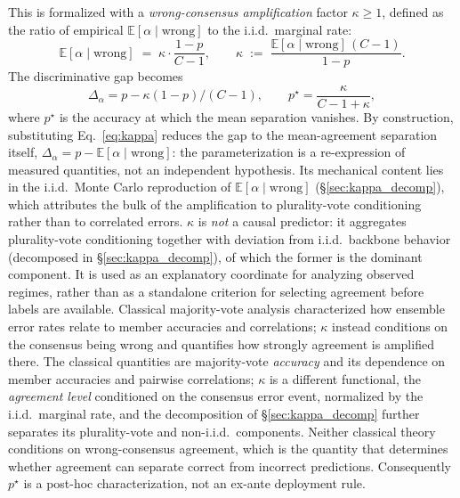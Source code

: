 \documentclass[a4paper,fleqn]{cas-sc}
\begin{document}
This is formalized with a \emph{wrong-consensus amplification} factor $\kappa \geq 1$, defined as the ratio of empirical $\mathbb{E}[\alpha \mid \text{wrong}]$ to the i.i.d.\ marginal rate:
\begin{equation}
\mathbb{E}[\alpha \mid \text{wrong}] \;=\; \kappa \cdot \frac{1-p}{C-1}, \qquad \kappa \;:=\; \frac{\mathbb{E}[\alpha \mid \text{wrong}]\,(C-1)}{1-p}.
\label{eq:kappa}
\end{equation}
The discriminative gap becomes
\begin{equation}
\Delta_\alpha = p - \kappa(1-p)/(C-1), \qquad p^\star = \frac{\kappa}{C-1+\kappa},
\label{eq:delta}
\end{equation}
where $p^\star$ is the accuracy at which the mean separation vanishes.
By construction, substituting Eq.~\eqref{eq:kappa} reduces the gap to the mean-agreement separation itself, $\Delta_\alpha = p - \mathbb{E}[\alpha \mid \text{wrong}]$: the parameterization is a re-expression of measured quantities, not an independent hypothesis.
Its mechanical content lies in the i.i.d.\ Monte Carlo reproduction of $\mathbb{E}[\alpha \mid \text{wrong}]$ (\S\ref{sec:kappa_decomp}), which attributes the bulk of the amplification to plurality-vote conditioning rather than to correlated errors.
$\kappa$ is \emph{not} a causal predictor: it aggregates plurality-vote conditioning together with deviation from i.i.d.\ backbone behavior (decomposed in \S\ref{sec:kappa_decomp}), of which the former is the dominant component.
It is used as an explanatory coordinate for analyzing observed regimes, rather than as a standalone criterion for selecting agreement before labels are available.
Classical majority-vote analysis \citep{hansen1990neural, lam1997application} characterized how ensemble error rates relate to member accuracies and correlations; $\kappa$ instead conditions on the consensus being wrong and quantifies how strongly agreement is amplified there. The classical quantities are majority-vote \emph{accuracy} and its dependence on member accuracies and pairwise correlations; $\kappa$ is a different functional, the \emph{agreement level} conditioned on the consensus error event, normalized by the i.i.d.\ marginal rate, and the decomposition of \S\ref{sec:kappa_decomp} further separates its plurality-vote and non-i.i.d.\ components. Neither classical theory conditions on wrong-consensus agreement, which is the quantity that determines whether agreement can separate correct from incorrect predictions.
Consequently $p^\star$ is a post-hoc characterization, not an ex-ante deployment rule.
\end{document}
